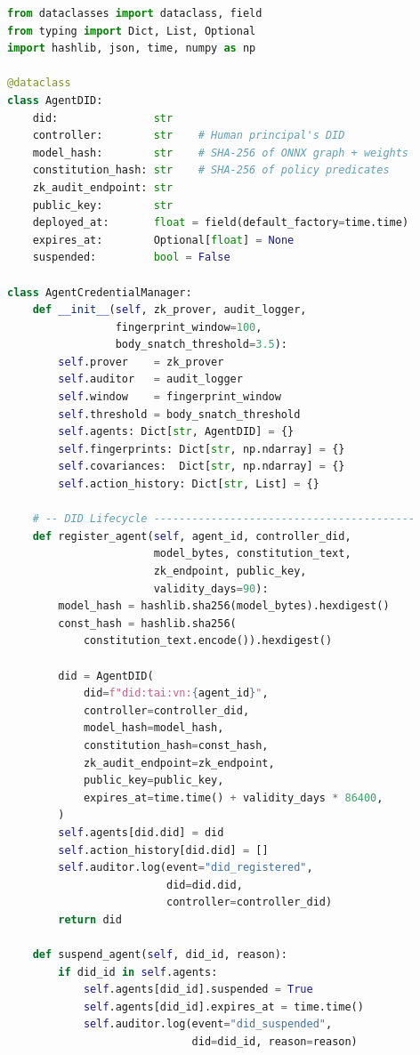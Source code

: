 \begin{lstlisting}[language=Python, style=pythonstyle,
  caption={Agent Credential Manager: DID Document lifecycle,
           ZK-bound action proofs, and behavioural fingerprint
           monitoring for autonomous AI agents.},
  label={lst:agent-credential-manager}
]
from dataclasses import dataclass, field
from typing import Dict, List, Optional
import hashlib, json, time, numpy as np

@dataclass
class AgentDID:
    did:               str
    controller:        str    # Human principal's DID
    model_hash:        str    # SHA-256 of ONNX graph + weights
    constitution_hash: str    # SHA-256 of policy predicates
    zk_audit_endpoint: str
    public_key:        str
    deployed_at:       float = field(default_factory=time.time)
    expires_at:        Optional[float] = None
    suspended:         bool = False

class AgentCredentialManager:
    def __init__(self, zk_prover, audit_logger,
                 fingerprint_window=100,
                 body_snatch_threshold=3.5):
        self.prover    = zk_prover
        self.auditor   = audit_logger
        self.window    = fingerprint_window
        self.threshold = body_snatch_threshold
        self.agents: Dict[str, AgentDID] = {}
        self.fingerprints: Dict[str, np.ndarray] = {}
        self.covariances:  Dict[str, np.ndarray] = {}
        self.action_history: Dict[str, List] = {}

    # -- DID Lifecycle -----------------------------------------
    def register_agent(self, agent_id, controller_did,
                       model_bytes, constitution_text,
                       zk_endpoint, public_key,
                       validity_days=90):
        model_hash = hashlib.sha256(model_bytes).hexdigest()
        const_hash = hashlib.sha256(
            constitution_text.encode()).hexdigest()

        did = AgentDID(
            did=f"did:tai:vn:{agent_id}",
            controller=controller_did,
            model_hash=model_hash,
            constitution_hash=const_hash,
            zk_audit_endpoint=zk_endpoint,
            public_key=public_key,
            expires_at=time.time() + validity_days * 86400,
        )
        self.agents[did.did] = did
        self.action_history[did.did] = []
        self.auditor.log(event="did_registered",
                         did=did.did,
                         controller=controller_did)
        return did

    def suspend_agent(self, did_id, reason):
        if did_id in self.agents:
            self.agents[did_id].suspended = True
            self.agents[did_id].expires_at = time.time()
            self.auditor.log(event="did_suspended",
                             did=did_id, reason=reason)


\end{lstlisting}
